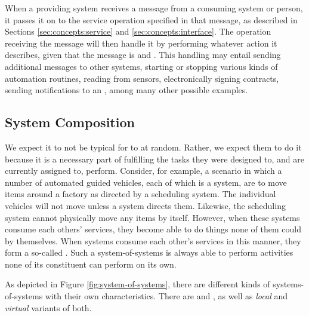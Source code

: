 When a providing system receives a message from a consuming system or person, it passes it on to the service operation specified in that message, as described in Sections \ref{sec:concepts:service} and \ref{sec:concepts:interface}.
The operation receiving the message will then handle it by performing whatever action it describes, given that the message is  and .
This handling may entail sending additional messages to other systems, starting or stopping various kinds of automation routines, reading from sensors, electronically signing contracts, sending notifications to an , among many other possible examples.

\subsection{System Composition}

We expect it to not be typical for  to  at random.
Rather, we expect them to do it because it is a necessary part of fulfilling the tasks they were designed to, and are currently assigned to, perform.
Consider, for example, a scenario in which a number of automated guided vehicles, each of which is a system, are to move items around a factory as directed by a scheduling system.
The individual vehicles will not move unless a system directs them.
Likewise, the scheduling system cannot physically move any items by itself.
However, when these systems consume each others' services, they become able to do things none of them could by themselves.
When systems consume each other's services in this manner, they form a so-called .
Such a system-of-systems is always able to perform activities none of its constituent  can perform on its own.

As depicted in Figure \ref{fig:system-of-systems}, there are different kinds of systems-of-systems with their own characteristics.
There are  and , as well as \textit{local} and \textit{virtual} variants of both.

\vfill

